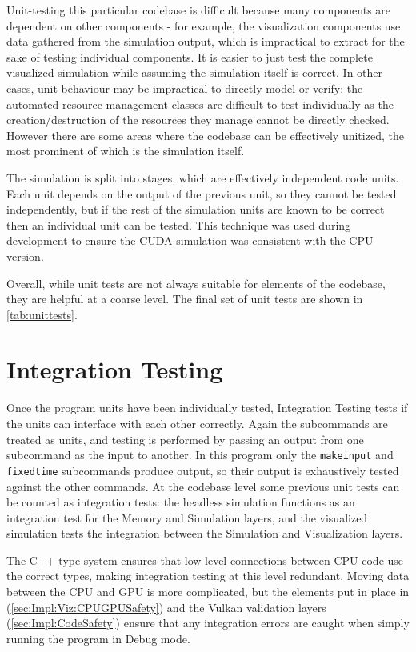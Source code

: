 Unit-testing this particular codebase is difficult because many components are dependent on other components - for example, the visualization components use data gathered from the simulation output, which is impractical to extract for the sake of testing individual components.
It is easier to just test the complete visualized simulation while assuming the simulation itself is correct.
In other cases, unit behaviour may be impractical to directly model or verify: the automated resource management classes are difficult to test individually as the creation/destruction of the resources they manage cannot be directly checked.
However there are some areas where the codebase can be effectively unitized, the most prominent of which is the simulation itself.

The simulation is split into stages, which are effectively independent code units.
Each unit depends on the output of the previous unit, so they cannot be tested independently, but if the rest of the simulation units are known to be correct then an individual unit can be tested.
This technique was used during development to ensure the CUDA simulation was consistent with the CPU version.

Overall, while unit tests are not always suitable for elements of the codebase, they are helpful at a coarse level.
The final set of unit tests are shown in \cref{tab:unittests}.

\section{Integration Testing}
Once the program units have been individually tested, Integration Testing tests if the units can interface with each other correctly.
Again the subcommands are treated as units, and testing is performed by passing an output from one subcommand as the input to another.
In this program only the \texttt{makeinput} and \texttt{fixedtime} subcommands produce output, so their output is exhaustively tested against the other commands.
At the codebase level some previous unit tests can be counted as integration tests:
the headless simulation functions as an integration test for the Memory and Simulation layers, and the visualized simulation tests the integration between the Simulation and Visualization layers.

The C++ type system ensures that low-level connections between CPU code use the correct types, making integration testing at this level redundant.
Moving data between the CPU and GPU is more complicated, but the elements put in place in (\cref{sec:Impl:Viz:CPUGPUSafety}) and the Vulkan validation layers (\cref{sec:Impl:CodeSafety}) ensure that any integration errors are caught when simply running the program in Debug mode.

